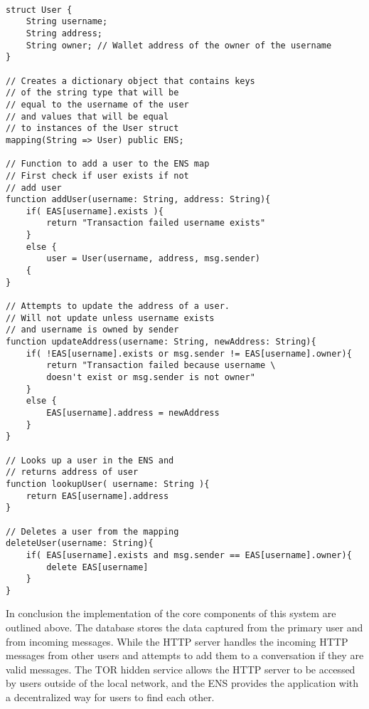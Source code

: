 \documentclass[../main/main.tex]{subfiles}
\begin{document}
\begin{lstlisting}[caption={Psuedocode for ENS.}, label={lst:example6}]

struct User {
	String username;
	String address;
	String owner; // Wallet address of the owner of the username
}

// Creates a dictionary object that contains keys
// of the string type that will be 
// equal to the username of the user
// and values that will be equal
// to instances of the User struct
mapping(String => User) public ENS;

// Function to add a user to the ENS map
// First check if user exists if not
// add user
function addUser(username: String, address: String){
	if( EAS[username].exists ){
		return "Transaction failed username exists"
	} 
	else {
		user = User(username, address, msg.sender)
	{
}

// Attempts to update the address of a user.
// Will not update unless username exists
// and username is owned by sender
function updateAddress(username: String, newAddress: String){
	if( !EAS[username].exists or msg.sender != EAS[username].owner){
		return "Transaction failed because username \
		doesn't exist or msg.sender is not owner"
	} 
	else {
		EAS[username].address = newAddress
	}
}

// Looks up a user in the ENS and
// returns address of user
function lookupUser( username: String ){
	return EAS[username].address
}

// Deletes a user from the mapping
deleteUser(username: String){
	if( EAS[username].exists and msg.sender == EAS[username].owner){
		delete EAS[username]
	}
}

\end{lstlisting}

In conclusion the implementation of the core components of this system are outlined above. The database stores the data captured from the primary user and from incoming messages. 
While the HTTP server handles the incoming HTTP messages from other users and attempts to add them to a conversation if they are valid messages. 
The TOR hidden service allows the HTTP server to be accessed by users outside of the local network, and the ENS provides the application with a decentralized way for users to find each other. 
\end{document}
